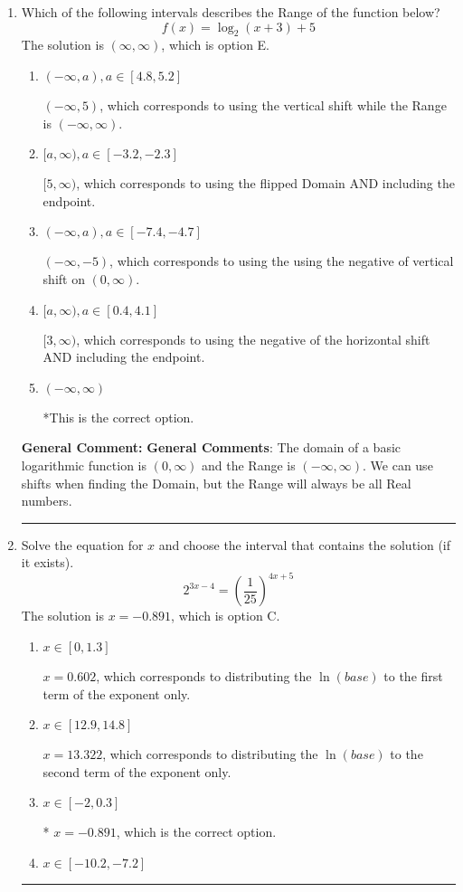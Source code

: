 \documentclass{extbook}[14pt]
\newcommand{\litem}[1]{\item #1

\rule{\textwidth}{0.4pt}}
\begin{document}
\begin{enumerate}\litem{
Which of the following intervals describes the Range of the function below?
\[ f(x) = \log_2{(x+3)}+5 \]The solution is \( (\infty, \infty) \), which is option E.\begin{enumerate}[label=\Alph*.]
\item \( (-\infty, a), a \in [4.8, 5.2] \)

$(-\infty, 5)$, which corresponds to using the vertical shift while the Range is $(-\infty, \infty)$.
\item \( [a, \infty), a \in [-3.2, -2.3] \)

$[5, \infty)$, which corresponds to using the flipped Domain AND including the endpoint.
\item \( (-\infty, a), a \in [-7.4, -4.7] \)

$(-\infty, -5)$, which corresponds to using the using the negative of vertical shift on $(0, \infty)$.
\item \( [a, \infty), a \in [0.4, 4.1] \)

$[3, \infty)$, which corresponds to using the negative of the horizontal shift AND including the endpoint.
\item \( (-\infty, \infty) \)

*This is the correct option.
\end{enumerate}

\textbf{General Comment:} \textbf{General Comments}: The domain of a basic logarithmic function is $(0, \infty)$ and the Range is $(-\infty, \infty)$. We can use shifts when finding the Domain, but the Range will always be all Real numbers.
}
\litem{
Solve the equation for $x$ and choose the interval that contains the solution (if it exists).
\[ 2^{3x-4} = \left(\frac{1}{25}\right)^{4x+5} \]The solution is \( x = -0.891 \), which is option C.\begin{enumerate}[label=\Alph*.]
\item \( x \in [0, 1.3] \)

$x = 0.602$, which corresponds to distributing the $\ln(base)$ to the first term of the exponent only.
\item \( x \in [12.9, 14.8] \)

$x = 13.322$, which corresponds to distributing the $\ln(base)$ to the second term of the exponent only.
\item \( x \in [-2, 0.3] \)

* $x = -0.891$, which is the correct option.
\item \( x \in [-10.2, -7.2] \)


\end{enumerate}}
\end{enumerate}
\end{document}
